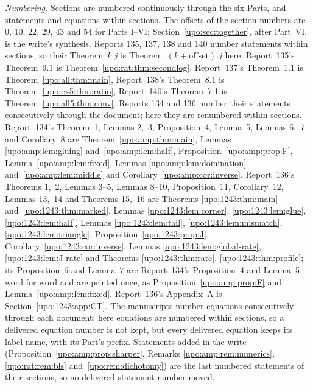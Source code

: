 \documentclass[11pt,letterpaper]{article}
\theoremstyle{remark}\newtheorem{remark}[theorem]{Remark}
\numberwithin{equation}{section}
\begin{document}
\emph{Numbering.} Sections are numbered continuously through the six Parts, and statements and equations within sections. The offsets of the section numbers are $0$, $10$, $22$, $29$, $43$ and $54$ for Parts I--VI; Section~\ref{upo:sec:together}, after Part~VI, is the write's synthesis. Reports 135, 137, 138 and 140 number statements within sections, so their Theorem~$k.j$ is Theorem~$(k+\text{offset}).j$ here: Report~135's Theorem~9.1 is Theorem~\ref{upo:rat:thm:secondlog}, Report~137's Theorem~1.1 is Theorem~\ref{upo:all:thm:main}, Report~138's Theorem~8.1 is Theorem~\ref{upo:ex5:thm:ratio}, Report~140's Theorem~7.1 is Theorem~\ref{upo:all5:thm:conv}. Reports 134 and 136 number their statements consecutively through the document; here they are renumbered within sections. Report~134's Theorem~1, Lemmas 2,~3, Proposition~4, Lemma~5, Lemmas 6,~7 and Corollary~8 are Theorem~\ref{upo:amp:thm:main}, Lemmas \ref{upo:amp:lem:gluing} and~\ref{upo:amp:lem:half}, Proposition~\ref{upo:amp:prop:F}, Lemma~\ref{upo:amp:lem:fixed}, Lemmas \ref{upo:amp:lem:domination} and~\ref{upo:amp:lem:middle} and Corollary~\ref{upo:amp:cor:inverse}. Report~136's Theorems 1,~2, Lemmas 3--5, Lemmas 8--10, Proposition~11, Corollary~12, Lemmas 13,~14 and Theorems 15,~16 are Theorems \ref{upo:1243:thm:main} and~\ref{upo:1243:thm:marked}, Lemmas \ref{upo:1243:lem:corner}, \ref{upo:1243:lem:glue}, \ref{upo:1243:lem:half}, Lemmas \ref{upo:1243:lem:tail}, \ref{upo:1243:lem:mismatch}, \ref{upo:1243:lem:triangle}, Proposition~\ref{upo:1243:prop:J}, Corollary~\ref{upo:1243:cor:inverse}, Lemmas \ref{upo:1243:lem:global-rate}, \ref{upo:1243:lem:J-rate} and Theorems \ref{upo:1243:thm:rate}, \ref{upo:1243:thm:profile}; its Proposition~6 and Lemma~7 are Report~134's Proposition~4 and Lemma~5 word for word and are printed once, as Proposition~\ref{upo:amp:prop:F} and Lemma~\ref{upo:amp:lem:fixed}. Report~136's Appendix~A is Section~\ref{upo:1243:app:CT}. The manuscripts number equations consecutively through each document; here equations are numbered within sections, so a delivered equation number is not kept, but every delivered equation keeps its label name, with its Part's prefix. Statements added in the write (Proposition~\ref{upo:amp:prop:sharper}, Remarks \ref{upo:amp:rem:numerics}, \ref{upo:rat:rem:bls} and~\ref{upo:rem:dichotomy}) are the last numbered statements of their sections, so no delivered statement number moved.
\end{document}
